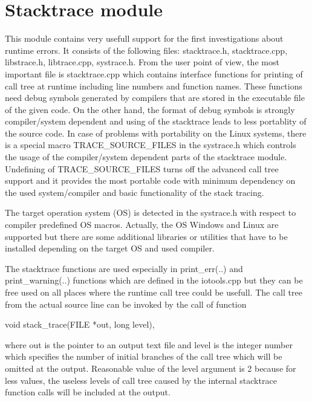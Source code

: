 \section {Stacktrace module}
This module contains very usefull support for the first investigations about runtime errors. It consists 
of the following files: {\sf stacktrace.h, stacktrace.cpp}, {\sf libstrace.h}, {\sf libtrace.cpp}, {\sf systrace.h}. 
From the user point of view, the most important file is {\sf stacktrace.cpp} which contains interface functions 
for printing of call tree at runtime including line numbers and function names. These functions need debug 
symbols generated by compilers that are stored in the executable file of the given code. On the other hand, 
the format of debug symbols is strongly compiler/system dependent and using of the stacktrace leads to 
less portablity of the source code. In case of problems with portability on the Linux systems, there is a 
special macro {\sf TRACE\_SOURCE\_FILES} in the {\sf systrace.h} which controls the usage of the compiler/system 
dependent parts of the stacktrace module. Undefining of {\sf TRACE\_SOURCE\_FILES} turns off the advanced call 
tree support and it provides the most portable code with minimum dependency on the used system/compiler and basic 
functionality of the stack tracing.

The target operation system (OS) is detected in the {\sf systrace.h} with respect to compiler predefined OS macros.
Actually, the OS Windows and Linux are supported but there are some additional libraries or utilities that  
have to be installed depending on the target OS and used compiler.

The stacktrace functions are used especially in {\sf print\_err(..)} and {\sf print\_warning(..)} functions which 
are defined in the {\sf iotools.cpp} but they can be free used on all places where the runtime call tree 
could be usefull. The call tree from the actual source line can be invoked by the call of function

\begin{center}
{\sf void stack\_trace(FILE *out, long level)},
\end{center}

where {\sf out} is the pointer to an output text file and {\sf level} is the integer number which specifies
the number of initial branches of the call tree which will be omitted at the output. Reasonable value of 
the {\sf level} argument is 2 because for less values, the useless levels of call tree caused by the internal 
stacktrace function calls will be included at the output.

